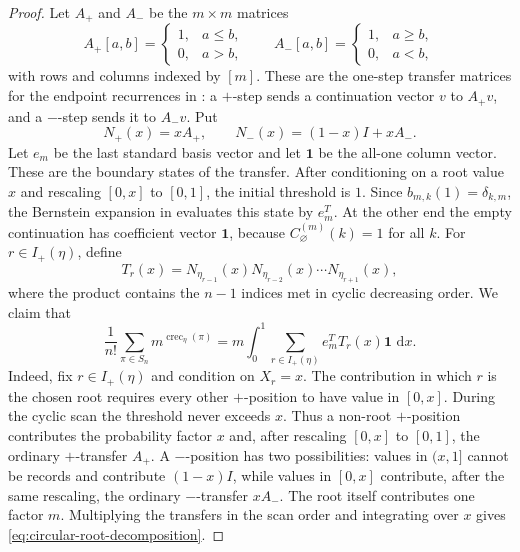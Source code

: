 \documentclass[10pt,a4paper]{amsart}
\newcommand{\dd}{\,\mathrm{d}}
\begin{document}
\begin{proof}
Let \(A_+\) and \(A_-\) be the \(m\times m\) matrices
\[
A_+[a,b]=
\begin{cases}
1,&a\le b,\\
0,&a>b,
\end{cases}
\qquad
A_-[a,b]=
\begin{cases}
1,&a\ge b,\\
0,&a<b,
\end{cases}
\]
with rows and columns indexed by \([m]\).  These are the one-step transfer
matrices for the endpoint recurrences in : a
\(+\)-step sends a continuation vector \(v\) to \(A_+v\), and a \(-\)-step
sends it to \(A_-v\).  Put
\[
N_+(x)=xA_+,
\qquad
N_-(x)=(1-x)I+xA_-.
\]
Let \(e_m\) be the last standard basis vector and let \(\mathbf 1\) be the
all-one column vector.  These are the boundary states of the transfer.  After
conditioning on a root value \(x\) and rescaling \([0,x]\) to \([0,1]\), the
initial threshold is \(1\).  Since \(b_{m,k}(1)=\delta_{k,m}\), the Bernstein
expansion in  evaluates this state by \(e_m^T\).  At the
other end the empty continuation has coefficient vector \(\mathbf 1\), because
\(C_\varnothing^{(m)}(k)=1\) for all \(k\).  For \(r\in I_+(\eta)\), define
\[
T_r(x)=N_{\eta_{r-1}}(x)N_{\eta_{r-2}}(x)\cdots
N_{\eta_{r+1}}(x),
\]
where the product contains the \(n-1\) indices met in cyclic decreasing
order.
We claim that
\begin{equation}\label{eq:circular-root-decomposition}
\frac1{n!}\sum_{\pi\in S_n}m^{\operatorname{crec}_\eta(\pi)}
=
m\int_0^1\sum_{r\in I_+(\eta)} e_m^T T_r(x)\mathbf 1\,\dd x .
\end{equation}
Indeed, fix \(r\in I_+(\eta)\) and condition on \(X_r=x\).  The contribution in
which \(r\) is the chosen root requires every other \(+\)-position to have value
in \([0,x]\).  During the cyclic scan the threshold never exceeds \(x\).  Thus a
non-root \(+\)-position contributes the probability factor \(x\) and, after
rescaling \([0,x]\) to \([0,1]\), the ordinary \(+\)-transfer \(A_+\).  A
\(-\)-position has two possibilities: values in \((x,1]\) cannot be records and
contribute \((1-x)I\), while values in \([0,x]\) contribute, after the same
rescaling, the ordinary \(-\)-transfer \(xA_-\).  The root itself contributes
one factor \(m\).  Multiplying the transfers in the scan order and integrating
over \(x\) gives \eqref{eq:circular-root-decomposition}.


\end{proof}
\end{document}
